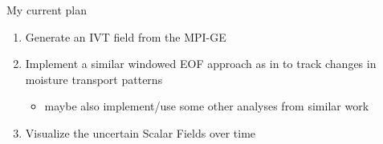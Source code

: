 \begin{frame}{My current plan}
  
  {\large
  \begin{enumerate}
    \item Generate an IVT field from the MPI-GE
    \item Implement a similar windowed EOF approach as in \cite{vietinghoff_visual_2021} to track changes in moisture transport patterns
      \begin{itemize}
        \item maybe also implement/use some other analyses from similar work 
      \end{itemize}
    \item Visualize the uncertain Scalar Fields over time
  \end{enumerate}
}
\end{frame}
